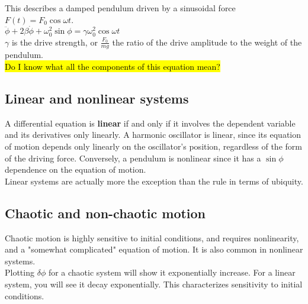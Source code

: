 \documentclass[a4paper, 11pt]{article}
\begin{document}
  This describes a damped pendulum driven by a sinusoidal force $F(t) = F_0 \cos{\omega t}$.\\
  $\ddot{\phi} + 2 \beta \dot{\phi} + \omega_0^2 \sin{\phi} = \gamma \omega_0^2 \cos{\omega t}$\\
  $\gamma$ is the drive strength, or $\frac{F_0}{mg}$ the ratio of the drive amplitude
  to the weight of the pendulum.\\
  \hl{Do I know what all the components of this equation mean?}\\



  \subsection{Linear and nonlinear systems}
  A differential equation is \textbf{linear} if and only if it involves the dependent
  variable and its derivatives only linearly. A harmonic oscillator is linear,
  since its equation of motion depends only linearly on the oscillator's position,
  regardless of the form of the driving force. Conversely, a pendulum is nonlinear
  since it has a $\sin{\phi}$ dependence on the equation of motion.\\

  Linear systems are actually more the exception than the rule in terms of ubiquity.


   \subsection{Chaotic and non-chaotic motion}
   Chaotic motion is highly sensitive to initial conditions, and requires nonlinearity,
   and a "somewhat complicated" equation of motion. It is also common in nonlinear systems.\\

   Plotting $\delta\phi$ for a chaotic system will show it exponentially increase.
   For a linear system, you will see it decay exponentially. This characterizes
   sensitivity to initial conditions.

\end{document}
